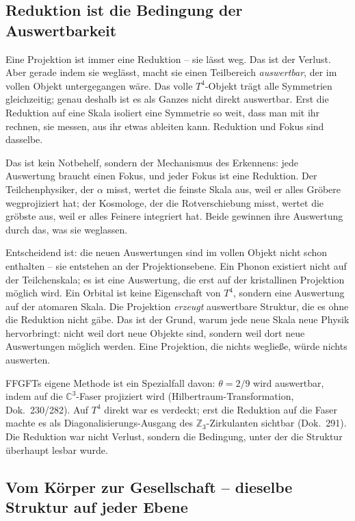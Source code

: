 \subsection*{Reduktion ist die Bedingung der Auswertbarkeit}

Eine Projektion ist immer eine Reduktion -- sie lässt weg. Das ist der
Verlust. Aber gerade indem sie weglässt, macht sie einen Teilbereich
\emph{auswertbar}, der im vollen Objekt untergegangen wäre. Das volle
$T^4$-Objekt trägt alle Symmetrien gleichzeitig; genau deshalb ist es als
Ganzes nicht direkt auswertbar. Erst die Reduktion auf eine Skala isoliert
eine Symmetrie so weit, dass man mit ihr rechnen, sie messen, aus ihr
etwas ableiten kann. Reduktion und Fokus sind dasselbe.

Das ist kein Notbehelf, sondern der Mechanismus des Erkennens: jede
Auswertung braucht einen Fokus, und jeder Fokus ist eine Reduktion. Der
Teilchenphysiker, der $\alpha$ misst, wertet die feinste Skala aus, weil er
alles Gröbere wegprojiziert hat; der Kosmologe, der die Rotverschiebung
misst, wertet die gröbste aus, weil er alles Feinere integriert hat. Beide
gewinnen ihre Auswertung durch das, was sie weglassen.

Entscheidend ist: die neuen Auswertungen sind im vollen Objekt nicht schon
enthalten -- sie entstehen an der Projektionsebene. Ein Phonon existiert
nicht auf der Teilchenskala; es ist eine Auswertung, die erst auf der
kristallinen Projektion möglich wird. Ein Orbital ist keine Eigenschaft von
$T^4$, sondern eine Auswertung auf der atomaren Skala. Die Projektion
\emph{erzeugt} auswertbare Struktur, die es ohne die Reduktion nicht gäbe.
Das ist der Grund, warum jede neue Skala neue Physik hervorbringt: nicht
weil dort neue Objekte sind, sondern weil dort neue Auswertungen möglich
werden. Eine Projektion, die nichts wegließe, würde nichts auswerten.

FFGFTs eigene Methode ist ein Spezialfall davon: $\theta = 2/9$ wird
auswertbar, indem auf die $\mathbb{C}^3$-Faser projiziert wird
(Hilbertraum-Transformation, Dok.~230/282). Auf $T^4$ direkt war es
verdeckt; erst die Reduktion auf die Faser machte es als
Diagonalisierungs-Ausgang des $\mathbb{Z}_3$-Zirkulanten sichtbar
(Dok.~291). Die Reduktion war nicht Verlust, sondern die Bedingung, unter
der die Struktur überhaupt lesbar wurde.

\subsection*{Vom Körper zur Gesellschaft -- dieselbe Struktur auf jeder Ebene}

